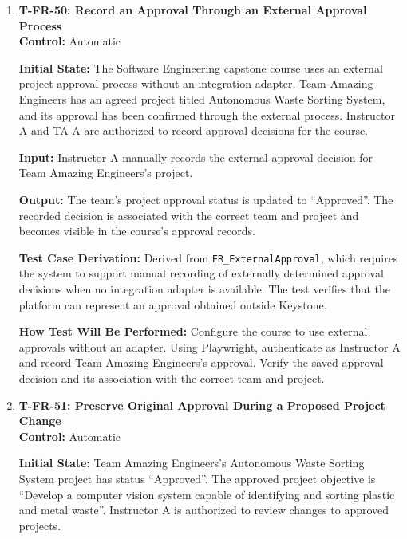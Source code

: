 \documentclass[12pt, titlepage]{article}
\begin{document}
\begin{enumerate}
\textbf{How Test Will Be Performed:} Configure the project and submitted team-project with the specified capacity values. Using Playwright, authenticate as Instructor A and reject the submission. Verify the rejection status, recorded feedback, released reservation, and project availability.

\item \label{T-FR-50}\textbf{T-FR-50: Record an Approval Through an External Approval Process}\\

\textbf{Control:} Automatic

\textbf{Initial State:} The Software Engineering capstone course uses an external project approval process without an integration adapter. Team Amazing Engineers has an agreed project titled Autonomous Waste Sorting System, and its approval has been confirmed through the external process. Instructor A and TA A are authorized to record approval decisions for the course.

\textbf{Input:} Instructor A manually records the external approval decision for Team Amazing Engineers's project.

\textbf{Output:} The team's project approval status is updated to ``Approved''. The recorded decision is associated with the correct team and project and becomes visible in the course's approval records.

\textbf{Test Case Derivation:} Derived from \texttt{FR\_ExternalApproval}, which requires the system to support manual recording of externally determined approval decisions when no integration adapter is available. The test verifies that the platform can represent an approval obtained outside Keystone.

\textbf{How Test Will Be Performed:} Configure the course to use external approvals without an adapter. Using Playwright, authenticate as Instructor A and record Team Amazing Engineers's approval. Verify the saved approval decision and its association with the correct team and project.

\item \label{T-FR-51}\textbf{T-FR-51: Preserve Original Approval During a Proposed Project Change}\\

\textbf{Control:} Automatic

\textbf{Initial State:} Team Amazing Engineers's Autonomous Waste Sorting System project has status ``Approved''. The approved project objective is ``Develop a computer vision system capable of identifying and sorting plastic and metal waste''. Instructor A is authorized to review changes to approved projects.


\end{enumerate}
\end{document}
